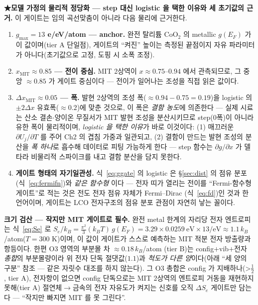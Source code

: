 \documentclass[11pt,a4paper]{article}
\begin{document}
\textbf{★모델 가정의 물리적 정당화 --- step 대신 logistic 을 택한 이유와 세 초기값의 근거.} 이 게이트는 임의 곡선맞춤이 아니라
다음 물리에 근거한다.
\begin{enumerate}[label=(\roman*),leftmargin=2.2em,itemsep=2pt]
\item \textbf{$g_{\max}=13$ e/eV/atom — anchor.} 완전 탈리튬 $\mathrm{CoO_2}$ 의 metallic $g(E_F)$ 가 이 값이며(tier A 단일점)\cite{motohashi2009}, 게이트의
``켜진'' 높이는 측정된 끝점이지 자유 파라미터가 아니다(초기값으로 고정, 도핑 시 소폭 조정).
\item \textbf{$x_\mathrm{MIT}\approx0.85$ — 전이 중심.} MIT 2상역이 $x\approx0.75$--$0.94$ 에서 관측되므로\cite{menetrier1999,reimers1992},
그 중앙 $\approx0.85$ 가 게이트 중심이다 — 전이가 일어나는 조성을 직접 읽은 값이다.
\item \textbf{$\Delta x_\mathrm{MIT}\approx0.05$ — 폭.} 발현 2상역의 조성 폭($\approx0.94{-}0.75=0.19$)을 logistic 의 $\pm2\Delta x$ 유효폭($\approx0.2$)에 맞춘
것으로, 이 폭은 \emph{결함 농도}에 의존한다 — 실제 시료는 산소 결손$\cdot$양이온 무질서가 MIT 발현 조성을
분산시키므로 step(0폭)이 아니라 유한 폭이 물리적이며, \emph{logistic 을 택한 이유}가 바로 이것이다: (1) 매끄러운
$\partial U_j/\partial T$ 를 주어 Ch2 의 겹침 가중과 일관되고, (2) 결함이 만드는 발현 조성의 분산을 \emph{폭
하나}로 흡수해 데이터로 피팅 가능하게 한다 — step 함수는 $\partial g/\partial x$ 가 델타라 비물리적 스파이크를
내고 결함 분산을 담지 못한다.
\item \textbf{게이트 형태의 자기일관성.} 식~\eqref{eq:ggate} 의 logistic 은 \S\ref{sec:dist} 의 점유 분포(식~\eqref{eq:fermifn})와 \emph{같은 함수형}
이다 — 전자 띠가 열리는 전이를 ``Fermi-함수형 게이트''로 적는 것은 전도 전자 점유 자체가 Fermi--Dirac
(식~\eqref{eq:fd})인 것과 한 언어이며, 게이트는 LCO 전자구조의 점유 분포 관점이 자연히 낳는 꼴이다.
\end{enumerate}

\textbf{크기 검산 — 작지만 MIT 게이트로 필수.} 완전 metal 한계의 자리당 전자 엔트로피는 식~\eqref{eq:Se} 로 $S_e/k_B=\tfrac{\pi^2}{3}(k_BT)\,g(E_F)
=3.29\times0.0259\ \mathrm{eV}\times13/\mathrm{eV}\approx1.1\,k_B$/atom($T{=}300$ K)이며, 이 값이 게이트가
스스로 예측하는 MIT 적분 전자 방출량과 항등이다. 한편 O3 영역의 부분몰 차 $\approx0.18\,k_B$/atom
\cite{reynier2004}(tier B)는 config$+$vib$+$전자 \emph{총합}의 부분몰량이라 위 전자 단독 절댓값($1.1$)과
\emph{척도가 다른 양}이다(아래 ``세 양의 구분'' 참조 — 같은 자릿수 대조를 하지 않는다). 그 O3 총합은 config 가
지배하나(>$\tfrac12$\cite{reynier2004}, tier A), 전자항이 없으면 config 단독으로는 MIT 2상역의 엔트로피 거동을
재현하지 못해\cite{ml2024}(tier A) 절연체$\to$금속의 전자 자유도가 켜지는 신호를 오직 $\Delta S_e$ 게이트만
담는다 — ``작지만 빠지면 MIT 를 못 그린다''.
\end{document}
